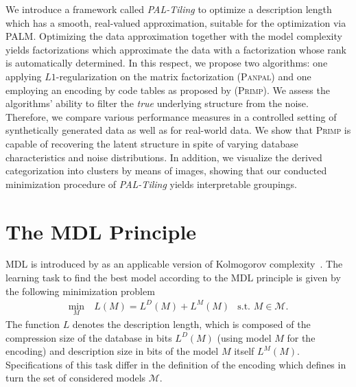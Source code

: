 We introduce a framework called \emph{PAL-Tiling} to optimize a description length which has a smooth, real-valued approximation, suitable for the optimization via PALM. Optimizing the data approximation together with the model complexity yields factorizations which approximate the data with a factorization whose rank is automatically determined. In this respect, we propose two algorithms: one applying $L1$-regularization on the matrix factorization (\textsc{Panpal}) and one employing an encoding by code tables as proposed by \cite{siebes2006item} (\textsc{Primp}). 
We assess the algorithms' ability to filter the \textit{true} underlying structure from the noise. Therefore, we compare various performance measures in a controlled setting of synthetically generated data as well as for real-world data. We show that \textsc{Primp} is capable of recovering the latent structure in spite of varying database characteristics and noise distributions. In addition, we visualize the derived categorization into clusters by means of images, showing that our conducted minimization procedure of \textit{PAL-Tiling} yields interpretable groupings. 
\section{The MDL Principle}
MDL is introduced by \cite{rissanen1978modeling} as an applicable version of Kolmogorov complexity~\citep{li2008introduction,grunwald2007minimum}.
The learning task to find the best model according to the MDL principle is given by the following minimization problem 
\begin{align*}
    	\min_M&\ L(M) = L^D(M) + L^M(M) &\text{s.t. } M\in\mathcal{M}.
\end{align*} 
The function $L$ denotes the description length, which is composed of the compression size of the database in bits $L^D(M)$ (using model $M$ for the encoding) and description size in bits of the model $M$ itself $L^M(M)$.
Specifications of this task differ in the definition of the encoding which defines in turn the set of considered models $\mathcal{M}$. 
